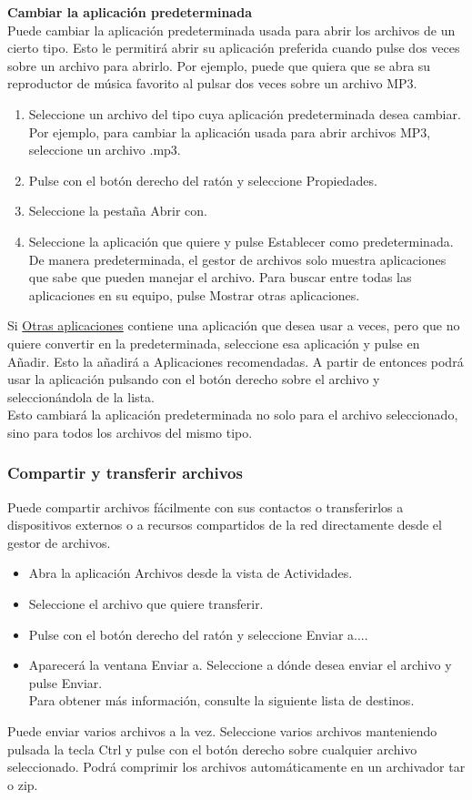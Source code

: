 {\bf Cambiar la aplicación predeterminada}\\
Puede cambiar la aplicación predeterminada usada para abrir los archivos de un cierto tipo. Esto le permitirá abrir su aplicación preferida cuando pulse dos veces sobre un archivo para abrirlo. Por ejemplo, puede que quiera que se abra su reproductor de música favorito al pulsar dos veces sobre un archivo MP3.
\begin{enumerate}
\item Seleccione un archivo del tipo cuya aplicación predeterminada desea cambiar. Por ejemplo, para cambiar la aplicación usada para abrir archivos MP3, seleccione un archivo .mp3.
\item Pulse con el botón derecho del ratón y seleccione Propiedades.
\item Seleccione la pestaña Abrir con.
\item Seleccione la aplicación que quiere y pulse Establecer como predeterminada. De manera predeterminada, el gestor de archivos solo muestra aplicaciones que sabe que pueden manejar el archivo. Para buscar entre todas las aplicaciones en su equipo, pulse Mostrar otras aplicaciones.
\end{enumerate}
Si \underline{Otras aplicaciones} contiene una aplicación que desea usar a veces, pero que no quiere convertir en la predeterminada, seleccione esa aplicación y pulse en Añadir. Esto la añadirá a Aplicaciones recomendadas. A partir de entonces podrá usar la aplicación pulsando con el botón derecho sobre el archivo y seleccionándola de la lista.\\

Esto cambiará la aplicación predeterminada no solo para el archivo seleccionado, sino para todos los archivos del mismo tipo.
\subsubsection{Compartir y transferir archivos}
Puede compartir archivos fácilmente con sus contactos o transferirlos a dispositivos externos o a recursos compartidos de la red directamente desde el gestor de archivos.\\
\begin{itemize}
\item Abra la aplicación Archivos desde la vista de Actividades.
\item Seleccione el archivo que quiere transferir.
\item Pulse con el botón derecho del ratón y seleccione Enviar a....
\item Aparecerá la ventana Enviar a. Seleccione a dónde desea enviar el archivo y pulse Enviar.\\ Para obtener más información, consulte la siguiente lista de destinos.
\end{itemize}
Puede enviar varios archivos a la vez. Seleccione varios archivos manteniendo pulsada la tecla Ctrl y pulse con el botón derecho sobre cualquier archivo seleccionado. Podrá comprimir los archivos automáticamente en un archivador tar o zip.\\

